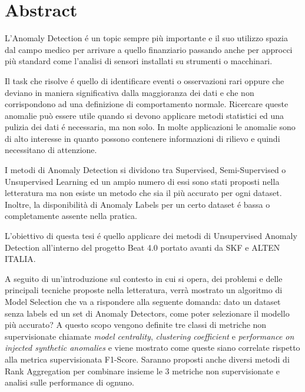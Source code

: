 \chapter*{Abstract}
L’Anomaly Detection é un topic sempre più importante e il suo utilizzo spazia dal campo medico per arrivare a quello finanziario passando anche per approcci più standard come l'analisi di sensori installati su strumenti o macchinari.

Il task che risolve é quello di identificare eventi o osservazioni rari oppure che deviano in maniera significativa dalla maggioranza dei dati e che non corrispondono ad una definizione di comportamento normale. Ricercare queste anomalie può essere utile quando si devono applicare metodi statistici ed una pulizia dei dati é necessaria, ma non solo. In molte applicazioni le anomalie sono di alto interesse in quanto possono contenere informazioni di rilievo e quindi necessitano di attenzione. 

I metodi di Anomaly Detection si dividono tra Supervised, Semi-Supervised o Unsupervised Learning ed un ampio numero di essi sono stati proposti nella letteratura ma non esiste un metodo che sia il più accurato per ogni dataset. Inoltre, la disponibilità di Anomaly Labels per un certo dataset é bassa o completamente assente nella pratica. 


L’obiettivo di questa tesi é quello applicare dei metodi di Unsupervised Anomaly Detection all'interno del progetto Beat 4.0 portato avanti da SKF e ALTEN ITALIA. 

A seguito di un'introduzione sul contesto in cui si opera, dei problemi e delle principali tecniche proposte nella letteratura, verrà mostrato un algoritmo di Model Selection che va a rispondere alla seguente domanda: dato un dataset senza labels ed un set di Anomaly Detectors, come poter selezionare il modello più accurato? A questo scopo vengono definite tre classi di metriche non supervisionate chiamate \textit{model centrality}, \textit{clustering coefficient} e \textit{performance on injected synthetic anomalies} e viene mostrato come queste siano correlate rispetto alla metrica supervisionata F1-Score. Saranno proposti anche diversi metodi di Rank Aggregation per combinare insieme le 3 metriche non supervisionate e analisi sulle performance di ognuno.

